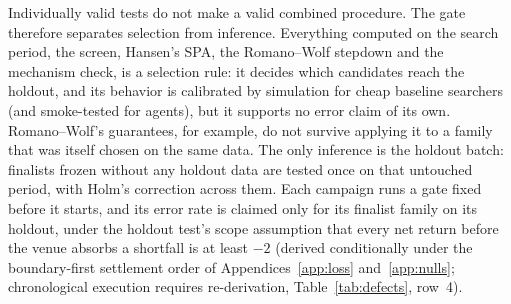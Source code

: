 \documentclass[11pt]{article}
\begin{document}
Individually valid tests do not make a valid combined procedure. The gate therefore separates selection from inference. Everything computed on the search period, the screen, Hansen's SPA, the Romano--Wolf stepdown and the mechanism check, is a selection rule: it decides which candidates reach the holdout, and its behavior is calibrated by simulation for cheap baseline searchers (and smoke-tested for agents), but it supports no error claim of its own. Romano--Wolf's guarantees, for example, do not survive applying it to a family that was itself chosen on the same data. The only inference is the holdout batch: finalists frozen without any holdout data are tested once on that untouched period, with Holm's correction \cite{holm1979} across them. Each campaign runs a gate fixed before it starts, and its error rate is claimed only for its finalist family on its holdout, under the holdout test's scope assumption that every net return before the venue absorbs a shortfall is at least $-2$ (derived conditionally under the boundary-first settlement order of Appendices~\ref{app:loss} and~\ref{app:nulls}; chronological execution requires re-derivation, Table~\ref{tab:defects}, row~4).
\end{document}
